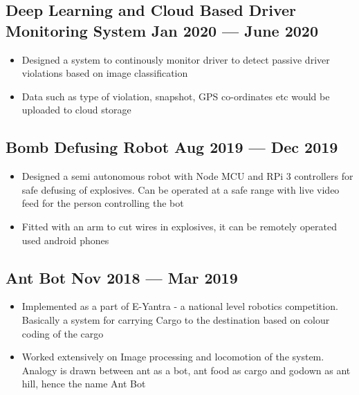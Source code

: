 \documentclass[a4,10pt]{article}
\newenvironment{zitemize}{
\begin{itemize}\itemsep0pt \parskip0pt \parsep1pt}
{\end{itemize}\vspace{-0.5cm}}
\begin{document}
\subsection*{Deep Learning and Cloud Based Driver Monitoring System \hfill Jan 2020 --- June 2020} 
    \begin{zitemize}
        \item Designed a system to continously monitor driver to detect passive driver violations based on image classification 
        \item Data such as type of violation, snapshot, GPS co-ordinates etc would be uploaded to cloud storage
    \end{zitemize}


\subsection*{Bomb Defusing Robot \hfill Aug 2019 --- Dec 2019} 
    \begin{zitemize}
        \item Designed a semi autonomous robot with Node MCU and RPi 3 controllers for safe defusing of explosives. Can be operated at a safe range with live video feed for the person controlling the bot
        \item Fitted with an arm to cut wires in explosives, it can be remotely operated used android phones
    \end{zitemize}


\subsection*{Ant Bot \hfill Nov 2018 --- Mar 2019} 
    \begin{zitemize}
        \item Implemented as a part of E-Yantra - a national level robotics competition. Basically a system for carrying Cargo to the destination based on colour coding of the cargo
        \item Worked extensively on Image processing and locomotion of the system. Analogy is drawn between ant as a bot, ant food as cargo and godown as ant hill, hence the name Ant Bot 
    \end{zitemize}
    
\end{document}

